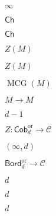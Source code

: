 \begin{preview}
\setcounter{equation}{0}%
\( \infty \)
\end{preview}

\begin{preview}
\setcounter{equation}{0}%
\( \mathsf{Ch} \)
\end{preview}

\begin{preview}
\setcounter{equation}{0}%
\( \mathsf{Ch} \)
\end{preview}

\begin{preview}
\setcounter{equation}{0}%
\( Z(M) \)
\end{preview}

\begin{preview}
\setcounter{equation}{0}%
\( Z(M) \)
\end{preview}

\begin{preview}
\setcounter{equation}{0}%
\( \operatorname{MCG}(M) \)
\end{preview}

\begin{preview}
\setcounter{equation}{0}%
\( M \to M \)
\end{preview}

\begin{preview}
\setcounter{equation}{0}%
\( d-1 \)
\end{preview}

\begin{preview}
\setcounter{equation}{0}%
\( Z : \mathsf{Cob}_d^{\mathrm{or}} \to \mathcal{C} \)
\end{preview}

\begin{preview}
\setcounter{equation}{0}%
\( (\infty,d) \)
\end{preview}

\begin{preview}
\setcounter{equation}{0}%
\( \mathsf{Bord}_d^{\mathrm{or}} \to \mathcal{C} \)
\end{preview}

\begin{preview}
\setcounter{equation}{0}%
\(d  \)
\end{preview}

\begin{preview}
\setcounter{equation}{0}%
\( d \)
\end{preview}

\begin{preview}
\setcounter{equation}{0}%
\( d \)
\end{preview}

